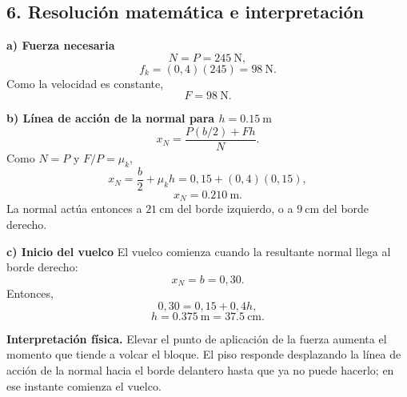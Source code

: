 \documentclass[12pt]{article}
\newcounter{ejercicio}
\newcommand{\ejercicio}[1]{%
  \refstepcounter{ejercicio}%
  \clearpage
  \section*{\color{AzulFisica}Ejercicio \theejercicio\ -- #1}%
  \addcontentsline{toc}{section}{Ejercicio \theejercicio: #1}%
}
\newcommand{\paso}[2]{%
  \subsection*{\color{AzulFisica}#1. #2}%
}
\begin{document}
\paso{6}{Resolución matemática e interpretación}
\textbf{a) Fuerza necesaria}
\[
N=P=\SI{245}{\newton},
\]
\[
f_k=(0,4)(245)=\SI{98}{\newton}.
\]
Como la velocidad es constante,
\[
\boxed{F=\SI{98}{\newton}}.
\]

\textbf{b) Línea de acción de la normal para $h=\SI{0.15}{\meter}$}
\[
x_N=\frac{P(b/2)+Fh}{N}.
\]
Como $N=P$ y $F/P=\mu_k$,
\[
x_N=\frac{b}{2}+\mu_kh
=0,15+(0,4)(0,15),
\]
\[
\boxed{x_N=\SI{0.210}{\meter}}.
\]
La normal actúa entonces a $\SI{21}{\centi\meter}$ del borde izquierdo, o a $\SI{9}{\centi\meter}$ del borde derecho.

\textbf{c) Inicio del vuelco}
El vuelco comienza cuando la resultante normal llega al borde derecho:
\[
x_N=b=0,30.
\]
Entonces,
\[
0,30=0,15+0,4h,
\]
\[
\boxed{h=\SI{0.375}{\meter}=\SI{37.5}{\centi\meter}}.
\]

\textbf{Interpretación física.} Elevar el punto de aplicación de la fuerza aumenta el momento que tiende a volcar el bloque. El piso responde desplazando la línea de acción de la normal hacia el borde delantero hasta que ya no puede hacerlo; en ese instante comienza el vuelco.



%
\end{document}
